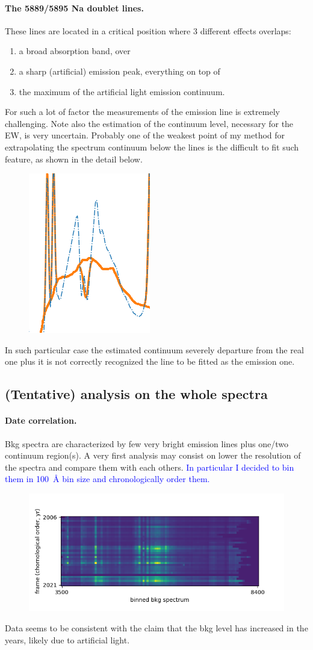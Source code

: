 \documentclass{article}
\newcommand{\arbitrario}[1]{\textcolor{blue}{#1}}
\begin{document}
\paragraph{The 5889/5895 Na doublet lines.} These lines are located in a critical position where 3 different effects overlaps: 
\begin{enumerate}
	\item a broad absorption band, over
	\item a sharp (artificial) emission peak, everything on top of
	\item the maximum of the artificial light emission continuum.
\end{enumerate}
For such a lot of factor the measurements of the emission line is extremely challenging. Note also the estimation of the continuum level, necessary for the EW, is very uncertain. Probably one of the weakest point of my method for extrapolating the spectrum continuum below the lines is the difficult to fit such feature, as shown in the detail below.
\begin{figure}[h!]
	\centering
	\includegraphics[width=.15\textwidth]{./2012}
\end{figure}
In such particular case the estimated continuum severely departure from the real one plus it is not correctly recognized the line to be fitted as the emission one.




\subsection{(Tentative) analysis on the whole spectra}

\paragraph{Date correlation.}
Bkg spectra are characterized by few very bright emission lines plus one/two continuum region(s). A very first analysis may consist on lower the resolution of the spectra and compare them with each others. \arbitrario{In particular I decided to bin them in \SI{100}{\angstrom} bin size and chronologically order them.}
\begin{figure}[h!]
	\centering
	\includegraphics[width=.75\textwidth]{../Figure_1}
\end{figure}
Data seems to be consistent with the claim that the bkg level has increased in the years, likely due to artificial light.
\end{document}
